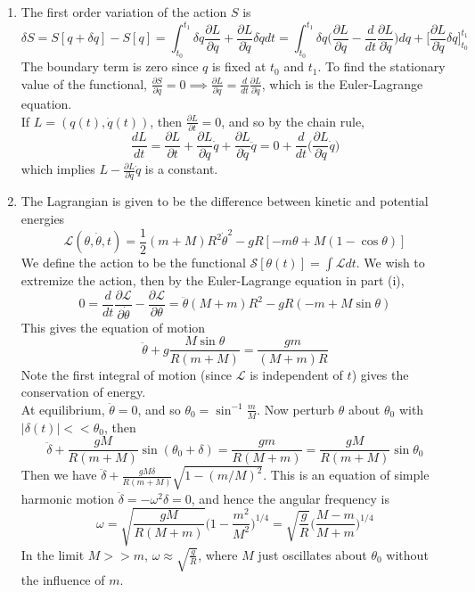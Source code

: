 \documentclass[a4paper]{article}
\begin{document}
\begin{ans}\leavevmode
\begin{enumerate}[label=(\roman*)]
\item The first order variation of the action $S$ is
$$\delta S=S[q+\delta q]-S[q]=\int_{t_0}^{t_1}\delta q\frac{\partial L}{\partial q}+\frac{\partial L}{\partial\dot{q}}\delta\dot{q}dt=\int_{t_0}^{t_1}\delta q\bigg(\frac{\partial L}{\partial q}-\frac{d}{dt}\frac{\partial L}{\partial\dot{q}}\bigg)dq+\bigg[\frac{\partial L}{\partial\dot{q}}\delta q\bigg]_{t_0}^{t_1}$$
The boundary term is zero since $q$ is fixed at $t_0$ and $t_1$. To find the stationary value of the functional, $\frac{\partial S}{\partial q}=0\implies\frac{\partial L}{\partial q}=\frac{d}{dt}\frac{\partial L}{\partial\dot{q}}$, which is the Euler-Lagrange equation.\\[5pt]
If $L=(q(t),\dot{q}(t))$, then $\frac{\partial L}{\partial t}=0$, and so by the chain rule,
$$\frac{dL}{dt}=\frac{\partial L}{\partial t}+\frac{\partial L}{\partial q}\dot{q}+\frac{\partial L}{\partial \dot{q}}\ddot{q}=0+\frac{d}{dt}\bigg(\frac{\partial L}{\partial\dot{q}}\dot{q}\bigg)$$
which implies $L-\frac{\partial L}{\partial\dot{q}}\dot{q}$ is a constant.
\item The Lagrangian is given to be the difference between kinetic and potential energies
$$\mathcal{L}(\theta,\dot{\theta},t)=\frac{1}{2}(m+M)R^2\dot{\theta}^2-gR[-m\theta+M(1-\cos\theta)]$$
We define the action to be the functional $\mathcal{S}[\theta(t)]=\int\mathcal{L}dt$. We wish to extremize the action, then by the Euler-Lagrange equation in part (i),
$$0=\frac{d}{dt}\frac{\partial\mathcal{L}}{\partial\dot{\theta}}-\frac{\partial\mathcal{L}}{\partial\theta}=\ddot{\theta}(M+m)R^2-gR(-m+M\sin\theta)$$
This gives the equation of motion $$\ddot{\theta}+g\frac{M\sin\theta}{R(m+M)}=\frac{gm}{(M+m)R}$$
Note the first integral of motion (since $\mathcal{L}$ is independent of $t$) gives the conservation of energy.\\[5pt]
At equilibrium, $\ddot{\theta}=0$, and so $\theta_0=\sin^{-1}\frac{m}{M}$. Now perturb $\theta$ about $\theta_0$ with $|\delta(t)|<<\theta_0$, then
$$\ddot{\delta}+\frac{gM}{R(m+M)}\sin(\theta_0+\delta)=\frac{gm}{R(M+m)}=\frac{gM}{R(m+M)}\sin\theta_0$$
Then we have $\ddot{\delta}+\frac{gM\delta}{R(m+M)}\sqrt{1-(m/M)^2}$. This is an equation of simple harmonic motion $\ddot{\delta}=-\omega^2\delta=0$, and hence the angular frequency is 
$$\omega=\sqrt{\frac{gM}{R(M+m)}}\bigg(1-\frac{m^2}{M^2}\bigg)^{1/4}=\sqrt{\frac{g}{R}}\bigg(\frac{M-m}{M+m}\bigg)^{1/4}$$
In the limit $M>>m$, $\omega\approx\sqrt{\frac{g}{R}}$, where $M$ just oscillates about $\theta_0$ without the influence of $m$.
\end{enumerate}
\end{ans}
\end{document}
